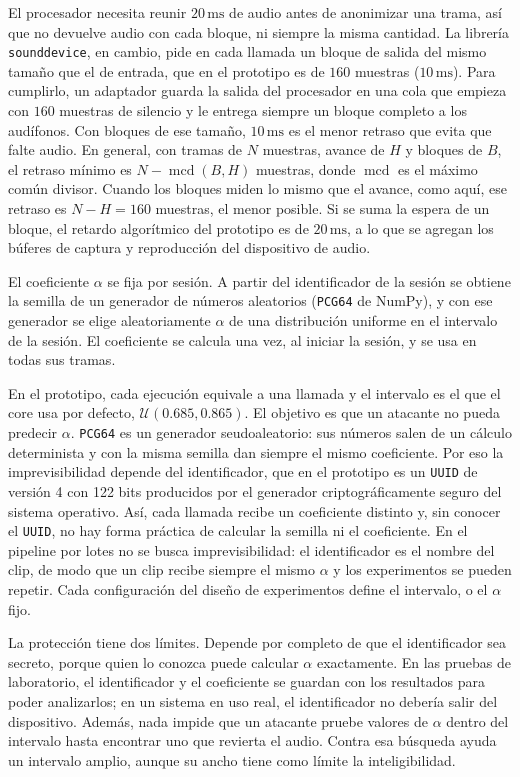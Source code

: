 \documentclass[10pt,twocolumn]{article}
\begin{document}
El procesador necesita reunir $20\,\mathrm{ms}$ de audio antes de anonimizar una trama, así que no devuelve audio con cada bloque, ni siempre la misma cantidad. La librería \texttt{sounddevice}, en cambio, pide en cada llamada un bloque de salida del mismo tamaño que el de entrada, que en el prototipo es de $160$ muestras ($10\,\mathrm{ms}$). Para cumplirlo, un adaptador guarda la salida del procesador en una cola que empieza con $160$ muestras de silencio y le entrega siempre un bloque completo a los audífonos. Con bloques de ese tamaño, $10\,\mathrm{ms}$ es el menor retraso que evita que falte audio. En general, con tramas de $N$ muestras, avance de $H$ y bloques de $B$, el retraso mínimo es $N-\operatorname{mcd}(B,H)$ muestras, donde $\operatorname{mcd}$ es el máximo común divisor. Cuando los bloques miden lo mismo que el avance, como aquí, ese retraso es $N-H=160$ muestras, el menor posible. Si se suma la espera de un bloque, el retardo algorítmico del prototipo es de $20\,\mathrm{ms}$, a lo que se agregan los búferes de captura y reproducción del dispositivo de audio.

El coeficiente $\alpha$ se fija por sesión. A partir del identificador de la sesión se obtiene la semilla de un generador de números aleatorios (\texttt{PCG64} de NumPy), y con ese generador se elige aleatoriamente $\alpha$ de una distribución uniforme en el intervalo de la sesión. El coeficiente se calcula una vez, al iniciar la sesión, y se usa en todas sus tramas.

En el prototipo, cada ejecución equivale a una llamada y el intervalo es el que el core usa por defecto, $\mathcal{U}(0.685,0.865)$. El objetivo es que un atacante no pueda predecir $\alpha$. \texttt{PCG64} es un generador seudoaleatorio: sus números salen de un cálculo determinista y con la misma semilla dan siempre el mismo coeficiente. Por eso la imprevisibilidad depende del identificador, que en el prototipo es un \texttt{UUID} de versión 4 con 122 bits producidos por el generador criptográficamente seguro del sistema operativo. Así, cada llamada recibe un coeficiente distinto y, sin conocer el \texttt{UUID}, no hay forma práctica de calcular la semilla ni el coeficiente. En el pipeline por lotes no se busca imprevisibilidad: el identificador es el nombre del clip, de modo que un clip recibe siempre el mismo $\alpha$ y los experimentos se pueden repetir. Cada configuración del diseño de experimentos define el intervalo, o el $\alpha$ fijo.

La protección tiene dos límites. Depende por completo de que el identificador sea secreto, porque quien lo conozca puede calcular $\alpha$ exactamente. En las pruebas de laboratorio, el identificador y el coeficiente se guardan con los resultados para poder analizarlos; en un sistema en uso real, el identificador no debería salir del dispositivo. Además, nada impide que un atacante pruebe valores de $\alpha$ dentro del intervalo hasta encontrar uno que revierta el audio. Contra esa búsqueda ayuda un intervalo amplio, aunque su ancho tiene como límite la inteligibilidad.
\end{document}
